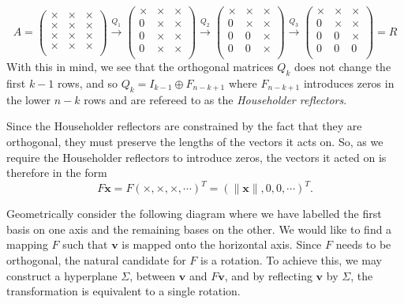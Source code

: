 \documentclass[
]{article}
\theoremstyle{definition}
\theoremstyle{definition}
\begin{document}
\[A = 
  \begin{pmatrix}
    \times & \times & \times \\
    \times & \times & \times \\ 
    \times & \times & \times \\
    \times & \times & \times \\
  \end{pmatrix} \xrightarrow{Q_1}
  \begin{pmatrix}
    \times & \times & \times \\
    0 & \times & \times \\ 
    0 & \times & \times \\
    0 & \times & \times \\
  \end{pmatrix}\xrightarrow{Q_2}
  \begin{pmatrix}
    \times & \times & \times \\
    0 & \times & \times \\ 
    0 & 0 & \times \\
    0 & 0 & \times \\
  \end{pmatrix}\xrightarrow{Q_3}
  \begin{pmatrix}
    \times & \times & \times \\
    0 & \times & \times \\ 
    0 & 0 & \times \\
    0 & 0 & 0 \\
  \end{pmatrix} = R\] With this in mind, we see that the orthogonal
matrices \(Q_k\) does not change the first \(k - 1\) rows, and so
\(Q_k = I_{k - 1} \oplus F_{n - k + 1}\) where \(F_{n - k + 1}\)
introduces zeros in the lower \(n - k\) rows and are refereed to as the
\emph{Householder reflectors}.

Since the Householder reflectors are constrained by the fact that they
are orthogonal, they must preserve the lengths of the vectors it acts
on. So, as we require the Householder reflectors to introduce zeros, the
vectors it acted on is therefore in the form
\[F \mathbf{x} = F (\times, \times, \times, \cdots)^T = 
  (\| \mathbf{x} \|, 0, 0, \cdots)^T.\]

Geometrically consider the following diagram where we have labelled the
first basis on one axis and the remaining bases on the other. We would
like to find a mapping \(F\) such that \(\mathbf{v}\) is mapped onto the
horizontal axis. Since \(F\) needs to be orthogonal, the natural
candidate for \(F\) is a rotation. To achieve this, we may construct a
hyperplane \(\Sigma\), between \(\mathbf{v}\) and \(F\mathbf{v}\), and
by reflecting \(\mathbf{v}\) by \(\Sigma\), the transformation is
equivalent to a single rotation.
\end{document}
